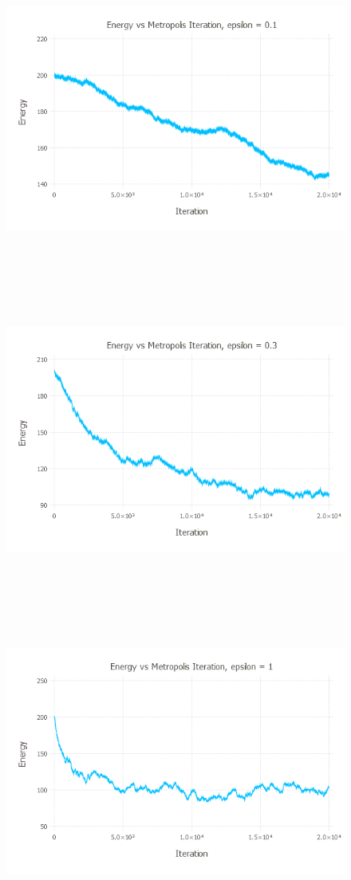 \documentclass{article}
\begin{document}
\begin{figure}[H]
	\includegraphics[width=6in,height=4in]{"equilibration01"}
\end{figure}
\begin{figure}[H]
	\includegraphics[width=6in,height=4in]{"equilibration03"}
\end{figure}
\begin{figure}[H]
	\includegraphics[width=6in,height=4in]{"equilibration1"}
\end{figure}
\end{document}
